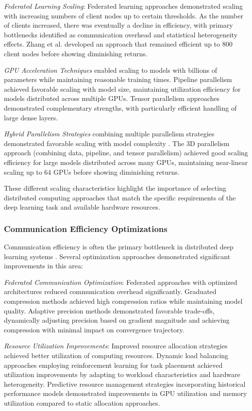 \textit{Federated Learning Scaling}: Federated learning approaches demonstrated scaling with increasing numbers of client nodes up to certain thresholds. As the number of clients increased, there was eventually a decline in efficiency, with primary bottlenecks identified as communication overhead and statistical heterogeneity effects. Zhang et al. \citep{Zhang20229876} developed an approach that remained efficient up to 800 client nodes before showing diminishing returns.

\textit{GPU Acceleration Techniques} enabled scaling to models with billions of parameters while maintaining reasonable training times. Pipeline parallelism achieved favorable scaling with model size, maintaining utilization efficiency for models distributed across multiple GPUs. Tensor parallelism approaches demonstrated complementary strengths, with particularly efficient handling of large dense layers.

\textit{Hybrid Parallelism Strategies} combining multiple parallelism strategies demonstrated favorable scaling with model complexity \citep{Narayanan2021}. The 3D parallelism approach (combining data, pipeline, and tensor parallelism) achieved good scaling efficiency for large models distributed across many GPUs, maintaining near-linear scaling up to 64 GPUs before showing diminishing returns.

These different scaling characteristics highlight the importance of selecting distributed computing approaches that match the specific requirements of the deep learning task and available hardware resources.

\subsubsection{Communication Efficiency Optimizations}
Communication efficiency is often the primary bottleneck in distributed deep learning systems \citep{Alistarh2017}. Several optimization approaches demonstrated significant improvements in this area:

\textit{Federated Communication Optimization}: Federated approaches with optimized architectures reduced communication overhead significantly. Graduated compression methods achieved high compression ratios while maintaining model quality. Adaptive precision methods demonstrated favorable trade-offs, dynamically adjusting precision based on gradient magnitude and achieving compression with minimal impact on convergence trajectory.

\textit{Resource Utilization Improvements}: Improved resource allocation strategies achieved better utilization of computing resources. Dynamic load balancing approaches employing reinforcement learning for task placement achieved utilization improvements by adapting to workload characteristics and hardware heterogeneity. Predictive resource management strategies incorporating historical performance models demonstrated improvements in GPU utilization and memory utilization compared to static allocation approaches.

